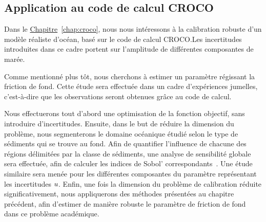 \documentclass[../../Main_ManuscritThese.tex]{subfiles}
\newcommand{\frchap}[1]{\hyperref[#1]{Chapitre}~\ref{#1}}
\begin{document}
\subsection*{Application au code de calcul CROCO}
Dans le \frchap{chap:croco}, nous nous intéressons à la calibration
robuste d'un modèle réaliste d'océan, basé sur le code de calcul
CROCO.\@ Les incertitudes introduites dans ce cadre portent sur
l'amplitude de différentes composantes de marée.

Comme mentionné plus tôt, nous cherchons à estimer un paramètre
régissant la friction de fond. Cette étude sera effectuée dans un
cadre d'expériences jumelles, c'est-à-dire que les observations seront
obtenues grâce au code de calcul.

Nous effectuerons tout d'abord une optimisation de la fonction
objectif, sans introduire d'incertitudes. Ensuite, dans le but de
réduire la dimension du problème, nous segmenterons le domaine
océanique étudié selon le type de sédiments qui se trouve au
fond. Afin de quantifier l'influence de chacune des régions délimitées
par la classe de sédiments, une analyse de sensibilité globale sera
effectuée, afin de calculer les indices de Sobol'
correspondants~\citep{sobol_global_2001,iooss_revue_2011}. Une étude
similaire sera menée pour les différentes composantes du paramètre
représentant les incertitudes $u$.
Enfin, une fois la dimension du problème de calibration réduite
significativement, nous appliquerons des méthodes présentées au
chapitre précédent, afin d'estimer de manière robuste le paramètre de
friction de fond dans ce problème académique.

\markchapterend




\subfileLocal{
	\pagestyle{empty}
	
	
}
\end{document}
